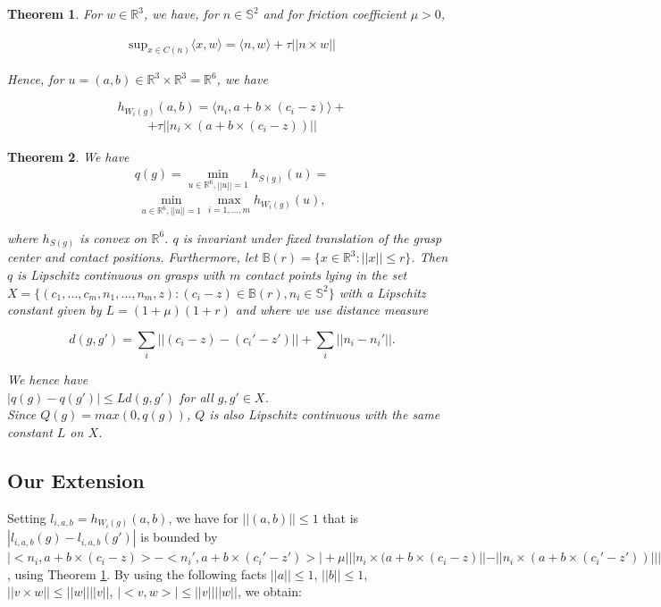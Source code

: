 \documentclass[letterpaper, 10 pt, conference]{ieeeconf}  %
\newtheorem{theorem}{Theorem}
\begin{document}
\begin{theorem}
\label{lemma35}
  \cite{pokorny2013classical}
For $w \in \mathbb{R}^3$, we have, for $n \in \mathbb{S}^2$ and for friction coefficient $\mu > 0$, 

\begin{align}
\mbox{sup}_{x \in C(n)} \langle x,w \rangle = \langle n,w \rangle + \tau||n \times w||
\end{align}

Hence, for $u = (a,b) \in \mathbb{R}^3 \times \mathbb{R}^3 = \mathbb{R}^6$, we have 

\[
h_{W_i(g)}(a,b) =
 \langle n_i,a+b\times(c_i-z)\rangle +
\]
\begin{align}
 +\tau ||n_i \times (a+b\times(c_i-z))||
\end{align}

\end{theorem}

\begin{theorem}
  \cite{pokorny2013classical}
We have \\

\begin{align}
q(g) 
=
\min_{u\in \mathbb{R}^6, ||u|| =1} h_{S(g)}(u) 
=
\end{align}
\[
\min_{u\in \mathbb{R}^6, ||u|| =1} \max_{i=1,...,m} h_{W_i(g)}(u),
\]

where $h_{S(g)}$ is convex on $\mathbb{R}^6$.
$q$ is invariant under fixed translation of the grasp center and contact positions.
Furthermore, let $\mathbb{B}(r) = \lbrace x \in \mathbb{R}^3 : ||x|| \leq r \rbrace$.
Then $q$ is Lipschitz continuous on grasps with $m$ contact points lying in the set $X = \lbrace (c_1, \dots, c_m,n_1, \dots,n_m,z) : (c_i-z) \in \mathbb{B}(r), n_i \in \mathbb{S}^2 \rbrace$ with a Lipschitz constant given by $L= (1+\mu)(1+r)$ and where we use distance measure 

\[
  d(g,g') = \sum_i ||(c_i-z)-(c_i'-z')|| + \sum_i ||n_i - n_i'||.
\]

We hence have \\

$|q(g) - q(g')| \leq Ld(g,g')$ for all $g,g' \in X$. \\

Since $Q(g) = max(0,q(g))$, $Q$ is also Lipschitz continuous with the same constant $L$ on $X$. 
\end{theorem}

\subsection{Our Extension}
Setting $l_{i,a,b} = h_{W_i(g)}(a,b)$, we have for $||(a,b)|| \leq 1$ that is $|l_{i,a,b}(g) - l_{i,a,b}(g')|$ is bounded by $|<n_i,a+b\times (c_i-z)> - <n_i',a+b\times(c_i'-z')>|+\mu|||n_i \times (a+b \times (c_i -z)|| - ||n_i \times (a + b \times (c_i' - z')) |||$, using Theorem \ref{lemma35}. By using the following facts $||a|| \leq 1$, $||b|| \leq 1$, $||v \times w || \leq ||w||||v||$, $|<v,w>| \leq ||v||||w||$, we obtain:  
\end{document}
